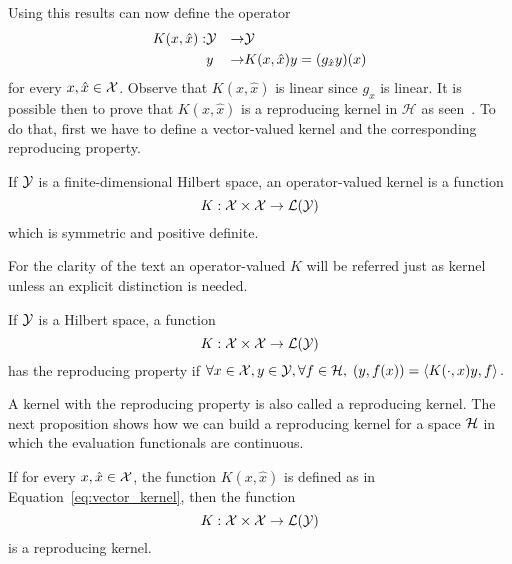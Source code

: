 Using this results can now define the operator
\begin{equation}\label{eq:vector_kernel}
    \begin{aligned}
        K(x, \hat{x}) : &\Yspace &\to &\Yspace \\
                        & y      &\to &K(x, \hat{x}) y = (g_{\hat{x}} y) (x)
    \end{aligned}    
\end{equation}
for every $x, \hat{x} \in \mathcal{X}$. Observe that $K(x, \hat{x})$ is linear since $g_x$ is linear.
It is possible then to prove that $K(x, \hat{x})$ is a reproducing kernel in $\mathcal{H}$ as seen~\cite[Propositon 2.1]{MicchelliP05}.
To do that, first we have to define a vector-valued kernel and the corresponding reproducing property.
\begin{definition}
    If $\mathcal{Y}$ is a finite-dimensional Hilbert space, an operator-valued kernel is a function
    \begin{equation}
        \nonumber
        K: \mathcal{X} \times \mathcal{X} \to \mathcal{L}(\mathcal{Y})
    \end{equation}
    which is symmetric and positive definite.
\end{definition}
For the clarity of the text an operator-valued $K$ will be referred just as kernel unless an explicit distinction is needed.
\begin{definition}
    If $\mathcal{Y}$ is a Hilbert space, a function
    \begin{equation}
        \nonumber
        K: \mathcal{X} \times \mathcal{X} \to \mathcal{L}(\mathcal{Y})
    \end{equation}
    has the reproducing property if $\forall x \in \mathcal{X}, y \in \mathcal{Y}, \forall f \in \mathcal{H},$ $ \left( y, f(x) \right) = \left\langle K(\cdot, x) y, f \right\rangle.$ 
\end{definition}
A kernel with the reproducing property is also called a reproducing kernel. The next proposition shows how we can build a reproducing kernel for a space $\mathcal{H}$ in which the evaluation functionals are continuous.
\begin{proposition}
    If for every $x, \hat{x} \in \mathcal{X}$, the function $K(x, \hat{x})$ is defined as in Equation~\eqref{eq:vector_kernel}, then the function
    \begin{equation}
        \nonumber
        K: \mathcal{X} \times \mathcal{X} \to \mathcal{L}(\mathcal{Y})
    \end{equation}
    is a reproducing kernel.
\end{proposition}
